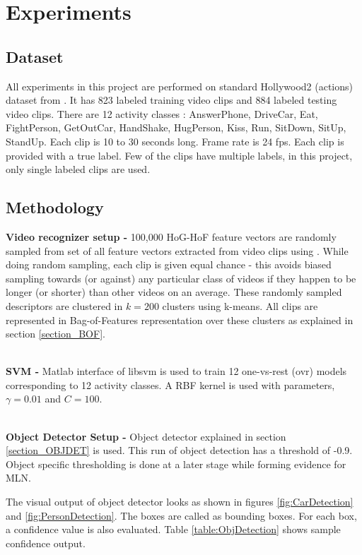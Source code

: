 \chapter{Experiments}

\label{ch5_RESULTS}
\section{Dataset} 
All experiments in this project are performed on standard Hollywood2 (actions) 
\cite{hollywood2} dataset from \cite{actionsInContext}. 
It has 823 labeled training video clips and 884 labeled testing video clips. 
There are 12 activity classes : AnswerPhone, DriveCar, Eat, FightPerson,
 GetOutCar, HandShake, HugPerson, Kiss, Run, SitDown, SitUp, StandUp.
 Each clip is 10 to 30 seconds long. Frame rate is 24 fps.
 Each clip is provided with a true label. Few of the clips have multiple labels, in this project, only single labeled clips are used.


 \section{Methodology}
 \label{section_METHODOLOGY}
 {\bf Video recognizer setup - } 100,000 HoG-HoF feature vectors are randomly sampled from 
 set of all feature vectors extracted from video clips using \cite{stipCode}.
 While doing random sampling, each clip is given equal chance - this avoids biased sampling
towards (or against) any particular class of videos if they happen to be longer (or shorter) than other videos on an average.
These randomly sampled descriptors are clustered in $k = 200$ clusters using k-means.
All clips are represented in Bag-of-Features representation over these clusters as explained in section \ref{section_BOF}.

~\\
{\bf SVM - } Matlab interface of libsvm \cite{libsvm} is used to train 
12 one-vs-rest (ovr) models corresponding to 12 activity classes. A RBF kernel is used with parameters, $\gamma = 0.01$ and $C = 100$.

~\\
{\bf Object Detector Setup - } Object detector explained in section \ref{section_OBJDET} is used. 
This run of object detection has a threshold of -0.9. 
Object specific thresholding is done at a later stage while forming evidence for MLN.

The visual output of object detector looks as shown in figures \ref{fig:CarDetection} and \ref{fig:PersonDetection}. 
The boxes are called as bounding boxes.
For each box, a confidence value is also evaluated.
Table \ref{table:ObjDetection} shows sample confidence output.

